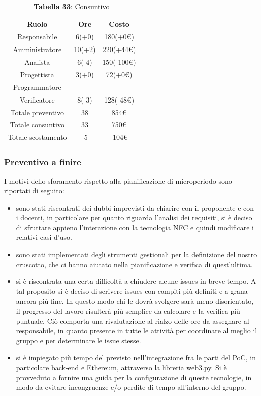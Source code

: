 \begin{table}[H]
	\centering
	\renewcommand{\arraystretch}{1.5}
	\begin{tabular}{|c|c|c|}
		\hline
		\rowcolor{lighter-grayer}
		Ruolo & Ore & Costo \\ \hline
		Responsabile & 6(+0) & 180(+0\euro) \\ \hline
		Amministratore & 10(+2) & 220(+44\euro) \\ \hline
		Analista & 6(-4) & 150(-100\euro) \\ \hline
		Progettista & 3(+0) & 72(+0\euro) \\ \hline
		Programmatore & - & - \\ \hline
		Verificatore & 8(-3) & 128(-48\euro) \\ \hline
		Totale preventivo & 38 & 854\euro \\ \hline
		Totale consuntivo & 33 & 750\euro \\ \hline
		Totale scostamento & -5 & -104\euro \\ \hline
	\end{tabular}
	\caption*{\textbf{Tabella 33}: Consuntivo\\}
\end{table}

\subsubsection{Preventivo a finire}

I motivi dello sforamento rispetto alla pianificazione di microperiodo sono riportati di seguito:
\begin{itemize}
	\item sono stati riscontrati dei dubbi imprevisti da chiarire con il proponente e con i docenti, in particolare 
per quanto riguarda l'analisi dei requisiti, si è deciso di sfruttare appieno l'interazione con la tecnologia NFC e
quindi modificare i relativi casi d'uso.
\item sono stati implementati degli strumenti gestionali per la definizione del nostro cruscotto, che ci hanno aiutato nella pianificazione 
e verifica di quest'ultima. 
\item si è riscontrata una certa difficoltà a chiudere alcune issues in breve tempo. 
A tal proposito si è deciso di scrivere issues con compiti più definiti e
a grana ancora più fine. In questo modo 
chi le dovrà svolgere sarà meno disorientato, il progresso del lavoro risulterà più semplice da calcolare
e la verifica più puntuale. Ciò comporta una rivalutazione al rialzo delle ore da assegnare al responsabile, in quanto
presente in tutte le attività per coordinare al meglio il gruppo e per determinare le issue stesse.
\item si è impiegato più tempo del previsto nell'integrazione fra le parti del PoC, in particolare back-end e Ethereum, attraverso la libreria web3.py. Si è provveduto a fornire una guida per la configurazione di queste tecnologie, in modo da evitare incongruenze e/o perdite di tempo all'interno del gruppo.
\end{itemize}


